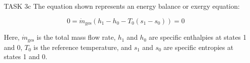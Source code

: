 TASK 3c  
The equation shown represents an energy balance or exergy equation:  

\[
0 = \dot{m}_{\text{ges}} \left( h_1 - h_0 - T_0 (s_1 - s_0) \right) = 0
\]  

Here, \( \dot{m}_{\text{ges}} \) is the total mass flow rate, \( h_1 \) and \( h_0 \) are specific enthalpies at states 1 and 0, \( T_0 \) is the reference temperature, and \( s_1 \) and \( s_0 \) are specific entropies at states 1 and 0.